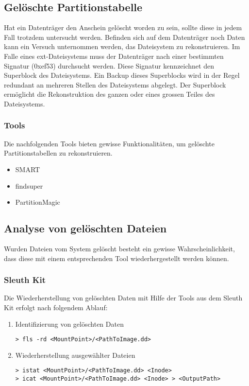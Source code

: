 	
\subsection{Gelöschte Partitionstabelle}
Hat ein Datenträger den Anschein gelöscht worden zu sein, sollte diese in jedem Fall trotzdem untersucht werden. Befinden sich auf dem Datenträger noch Daten kann ein Versuch unternommen werden, das Dateisystem zu rekonstruieren. Im Falle eines ext-Dateisystems muss der Datenträger nach einer bestimmten Signatur (0xef53) durchsucht werden. Diese Signatur kennzeichnet den Superblock des Dateisystems. Ein Backup dieses Superblocks wird in der Regel redundant an mehreren Stellen des Dateisystems abgelegt. Der Superblock ermöglicht die Rekonstruktion des ganzen oder eines grossen Teiles des Dateisystems.

\subsubsection{Tools} 
Die nachfolgenden Tools bieten gewisse Funktionalitäten, um gelöschte Partitionstabellen zu rekonstruieren.

\begin{itemize}
\item SMART
\item findsuper
\item PartitionMagic
\end{itemize}


\subsection{Analyse von gelöschten Dateien}
Wurden Dateien vom System gelöscht besteht ein gewisse Wahrscheinlichkeit, dass diese mit einem entsprechenden Tool wiederhergestellt werden können.

\subsubsection{Sleuth Kit}
Die Wiederherstellung von gelöschten Daten mit Hilfe der Tools aus dem Sleuth Kit erfolgt nach folgendem Ablauf:
 
\begin{enumerate}
\item Identifizierung von gelöschten Daten
\begin{lstlisting}
> fls -rd <MountPoint>/<PathToImage.dd>
\end{lstlisting}
\item Wiederherstellung ausgewählter Dateien
\begin{lstlisting}
> istat <MountPoint>/<PathToImage.dd> <Inode>
> icat <MountPoint>/<PathToImage.dd> <Inode> > <OutputPath>
\end{lstlisting}
\end{enumerate}

